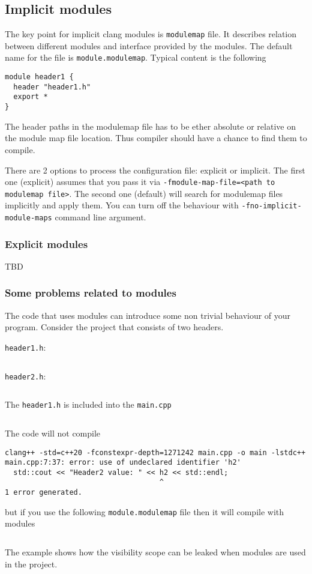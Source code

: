 \subsection{Implicit modules}
The key point for implicit clang modules is \texttt{modulemap}
file. It describes relation between different modules and interface
provided by the modules. The default name for the file is
\texttt{module.modulemap}. Typical content is the following
\begin{verbatim}
module header1 {
  header "header1.h"
  export *
}
\end{verbatim}
The header paths in the modulemap file has to be ether absolute or
relative on the module map file location. Thus compiler should have a
chance to find them to compile.

There are 2 options to process the configuration file: explicit or
implicit. The first one (explicit) assumes that you pass it via
\texttt{-fmodule-map-file=<path to modulemap file>}. The
second one (default) will search for modulemap files implicitly and
apply them. You can turn off the behaviour with
\texttt{-fno-implicit-module-maps} command line argument.


\subsubsection{Explicit modules}
TBD

\subsubsection{Some problems related to modules}
The code that uses modules can introduce some non trivial behaviour of
your program. Consider the project that consists of two headers.

\texttt{header1.h}:
\inputminted{c++}{./src/pcm/nontrivial/header1.h}

\texttt{header2.h}:
\inputminted{c++}{./src/pcm/nontrivial/header2.h}

The \texttt{header1.h} is included into the
\texttt{main.cpp}
\inputminted{c++}{./src/pcm/nontrivial/main.cpp}

The code will not compile

\begin{verbatim}
clang++ -std=c++20 -fconstexpr-depth=1271242 main.cpp -o main -lstdc++
main.cpp:7:37: error: use of undeclared identifier 'h2'
  std::cout << "Header2 value: " << h2 << std::endl;
                                    ^
1 error generated.
\end{verbatim}
but if you use the following \texttt{module.modulemap} file
then it will compile with modules
\inputminted{text}{./src/pcm/nontrivial/module.modulemap}
The example shows how the visibility scope can be leaked when
modules are used in the project. 

